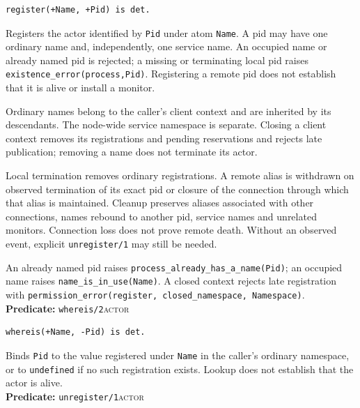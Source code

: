 \begin{verbatim}
register(+Name, +Pid) is det.
\end{verbatim}

Registers the actor identified by \texttt{Pid} under atom \texttt{Name}. A pid may have one ordinary
name and, independently, one service name. An occupied name or already named pid is rejected; a
missing or terminating local pid raises \texttt{existence\_\allowbreak{}error(\allowbreak{}process,\allowbreak{}Pid)}. Registering a remote
pid does not establish that it is alive or install a monitor.

Ordinary names belong to the caller's client context and are inherited by its
descendants. The node-wide service namespace is separate. Closing a client
context removes its registrations and pending reservations and rejects late
publication; removing a name does not terminate its actor.

Local termination removes ordinary registrations. A remote alias is withdrawn
on observed termination of its exact pid or closure of the connection through
which that alias is maintained. Cleanup preserves aliases associated with
other connections, names rebound to another pid, service names and unrelated
monitors. Connection loss does not prove remote death. Without an observed
event, explicit \texttt{unregister/1} may still be needed.

An already named pid raises
\texttt{process\_\allowbreak{}already\_\allowbreak{}has\_\allowbreak{}a\_\allowbreak{}name(Pid)};
an occupied name raises \texttt{name\_\allowbreak{}is\_\allowbreak{}in\_\allowbreak{}use(\allowbreak{}Name)}. A closed context
rejects late registration with
\texttt{permission\_\allowbreak{}error(\allowbreak{}register,\allowbreak{} closed\_\allowbreak{}namespace,\allowbreak{} Namespace)}.\\

\noindent \textbf{Predicate:} \texttt{whereis/\allowbreak{}2}\hfill\textsc{actor}

\begin{verbatim}
whereis(+Name, -Pid) is det.
\end{verbatim}

\noindent Binds \texttt{Pid} to the value registered under \texttt{Name} in
the caller's ordinary namespace, or to \texttt{undefined} if no such
registration exists. Lookup does not establish that the actor is alive.\\


\noindent \textbf{Predicate:} \texttt{unregister/\allowbreak{}1}\hfill\textsc{actor}

